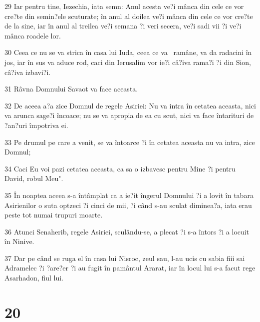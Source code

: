 \par 29 Iar pentru tine, Iezechia, iata semn: Anul acesta ve?i mânca din cele ce vor cre?te din semin?ele scuturate; în anul al doilea ve?i mânca din cele ce vor cre?te de la sine, iar în anul al treilea ve?i semana ?i veri secera, ve?i sadi vii ?i ve?i mânca roadele lor.
\par 30 Ceea ce nu se va strica în casa lui Iuda, ceea ce va  ramâne, va da radacini în jos, iar în sus va aduce rod, caci din Ierusalim vor ie?i câ?iva rama?i ?i din Sion, câ?iva izbavi?i.
\par 31 Râvna Domnului Savaot va face aceasta.
\par 32 De aceea a?a zice Domnul de regele Asiriei: Nu va intra în cetatea aceasta, nici va arunca sage?i încoace; nu se va apropia de ea cu scut, nici va face întarituri de ?an?uri împotriva ei.
\par 33 Pe drumul pe care a venit, se va întoarce ?i în cetatea aceasta nu va intra, zice Domnul;
\par 34 Caci Eu voi pazi cetatea aceasta, ca sa o izbavesc pentru Mine ?i pentru David, robul Meu".
\par 35 În noaptea aceea s-a întâmplat ca a ie?it îngerul Domnului ?i a lovit în tabara Asirienilor o suta optzeci ?i cinci de mii, ?i când s-au sculat diminea?a, iata erau peste tot numai trupuri moarte.
\par 36 Atunci Senaherib, regele Asiriei, sculându-se, a plecat ?i s-a întors ?i a locuit în Ninive.
\par 37 Dar pe când se ruga el în casa lui Nisroc, zeul sau, l-au ucis cu sabia fiii sai Adramelec ?i ?are?er ?i au fugit în pamântul Ararat, iar în locul lui s-a facut rege Asarhadon, fiul lui.

\chapter{20}

